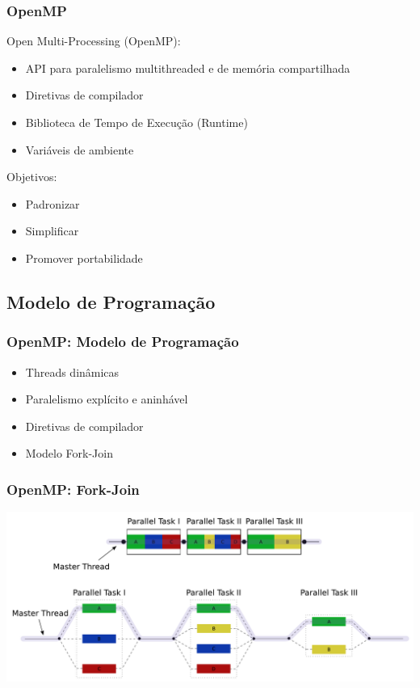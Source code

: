 \documentclass[10pt, compress, aspectratio=169, xcolor={table,usenames,dvipsnames}]{beamer}
\begin{document}
\begin{frame}
    \frametitle{OpenMP}
    \alert{Open Multi-Processing} (OpenMP):
    \begin{itemize}
        \item API para paralelismo \alert{multithreaded} e de \alert{memória
            compartilhada}
        \item \alert{Diretivas de compilador}
        \item Biblioteca de \alert{Tempo de Execução} (\alert{Runtime})
        \item Variáveis de ambiente
    \end{itemize}

    Objetivos:
    \begin{itemize}
        \item Padronizar
        \item Simplificar
        \item Promover \alert{portabilidade}
    \end{itemize}
\end{frame}

\subsection{Modelo de Programação}

\begin{frame}
    \frametitle{OpenMP: Modelo de Programação}
    \begin{itemize}
        \item Threads \alert{dinâmicas}
        \item Paralelismo \alert{explícito e aninhável}
        \item \alert{Diretivas} de compilador
        \item Modelo \alert{Fork-Join}
    \end{itemize}
\end{frame}

\begin{frame}
    \frametitle{OpenMP: Fork-Join}
    \begin{center}
        \includegraphics[width=.99\textwidth]{omp-fork-join}
    \end{center}
\end{frame}
\end{document}
